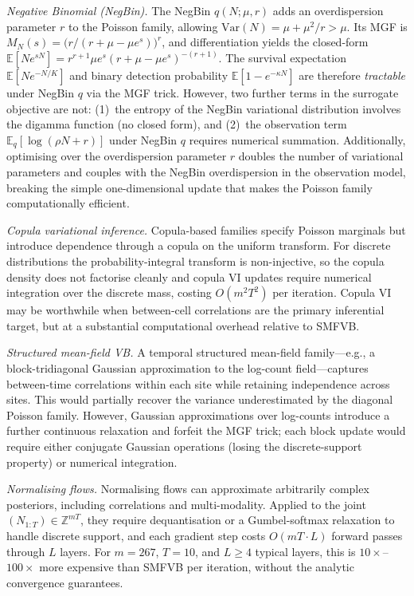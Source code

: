 \documentclass[review,12pt]{elsarticle}
\theoremstyle{definition}
\begin{document}
\noindent\textit{Negative Binomial (NegBin).}  The NegBin
$q(N;\mu,r)$ adds an overdispersion parameter $r$ to the
Poisson family, allowing $\mathrm{Var}(N)=\mu+\mu^2/r>\mu$.
Its MGF is $M_N(s)=\bigl(r/(r+\mu-\mu e^s)\bigr)^r$, and differentiation
yields the closed-form $\mathbb{E}[Ne^{sN}] = r^{r+1}\mu e^s(r+\mu-\mu e^s)^{-(r+1)}$.
The survival expectation $\mathbb{E}[Ne^{-N/K}]$ and binary detection probability
$\mathbb{E}[1-e^{-\kappa N}]$ are therefore \emph{tractable} under NegBin $q$ via
the MGF trick.  However, two further terms in the surrogate objective are not:
(1)~the entropy of the NegBin variational distribution involves the digamma
function (no closed form), and (2)~the observation term
$\mathbb{E}_q[\log(\rho N+r)]$ under NegBin $q$ requires numerical summation.
Additionally, optimising over the overdispersion parameter $r$ doubles the number
of variational parameters and couples with the NegBin overdispersion in the
observation model, breaking the simple one-dimensional update that makes the
Poisson family computationally efficient.

\noindent\textit{Copula variational inference.}  Copula-based families
\citep{tran2015} specify Poisson marginals but introduce dependence through a
copula on the uniform transform.  For discrete distributions the
probability-integral transform is non-injective, so the copula
density does not factorise cleanly and copula VI updates require
numerical integration over the discrete mass, costing $O(m^2T^2)$
per iteration.  Copula VI may be worthwhile when between-cell
correlations are the primary inferential target, but at a substantial
computational overhead relative to SMFVB.

\noindent\textit{Structured mean-field VB.}  A temporal structured
mean-field family---e.g., a block-tridiagonal Gaussian approximation
to the log-count field---captures between-time correlations within
each site while retaining independence across sites.  This would
partially recover the variance underestimated by the diagonal Poisson
family.  However, Gaussian approximations over log-counts introduce
a further continuous relaxation and forfeit the MGF trick; each block
update would require either conjugate Gaussian operations (losing the
discrete-support property) or numerical integration.

\noindent\textit{Normalising flows.}  Normalising flows
\citep{rezende2015} can approximate arbitrarily complex posteriors,
including correlations and multi-modality.  Applied to the joint
$(N_{1:T})\in\mathbb{Z}^{mT}$, they require dequantisation
\citep{hoogeboom2021} or a Gumbel-softmax relaxation to handle discrete
support, and each gradient step costs $O(mT\cdot L)$ forward passes
through $L$ layers.  For $m=267$, $T=10$, and $L\ge4$ typical layers,
this is $10\times$--$100\times$ more expensive than SMFVB per iteration,
without the analytic convergence guarantees.
\end{document}
